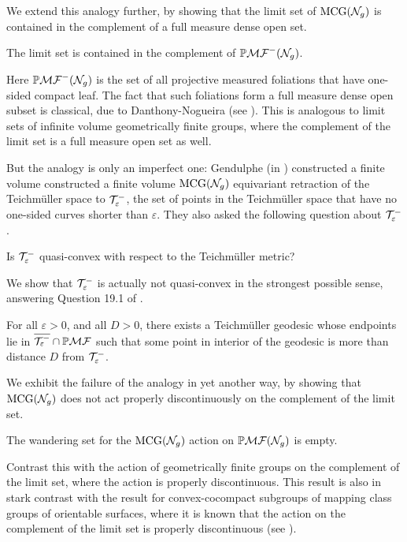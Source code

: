 \documentclass[12pt, reqno]{amsart}
\begin{document}
We extend this analogy further, by showing that the limit set of $\mathrm{MCG}(\mathcal{N}_g)$ is contained in the complement of a full measure dense open set.
\begingroup
\def\thetheorem{\ref{cor:geolimset}}
\begin{theorem}
  The limit set is contained in the complement of $\mathbb{P}\mathcal{MF}^-(\mathcal{N}_g)$.
\end{theorem}
\addtocounter{theorem}{-1}
\endgroup
Here $\mathbb{P}\mathcal{MF}^-(\mathcal{N}_g)$ is the set of all projective measured foliations that have one-sided compact leaf.
The fact that such foliations form a full measure dense open subset is classical, due to Danthony-Nogueira (see \cite{ASENS_1990_4_23_3_469_0}).
This is analogous to limit sets of infinite volume geometrically finite groups, where the complement of the limit set is a full measure open set as well.

But the analogy is only an imperfect one: Gendulphe (in \cite{gendulphe_whats_2017}) constructed a finite volume
constructed a finite volume $\mathrm{MCG}(\mathcal{N}_g)$ equivariant retraction of the Teichm\"uller space to $\mathcal{T}_{\varepsilon}^{-}$, the set of points in the Teichm\"uller space that have no one-sided curves shorter than $\varepsilon$.
They also asked the following question about $\mathcal{T}_{\varepsilon}^{-}$.
\begin{unquestion}
  Is $\mathcal{T}_{\varepsilon}^{-}$ quasi-convex with respect to the Teichmüller metric?
\end{unquestion}
We show that $\mathcal{T}_{\varepsilon}^{-}$ is actually not quasi-convex in the strongest possible sense, answering Question 19.1 of \cite{gendulphe_whats_2017}.
\begingroup
\def\thetheorem{\ref{thm:qc-fail}}
\begin{theorem}
  For all $\varepsilon > 0$, and all $D > 0$, there exists a Teichm\"uller geodesic whose endpoints lie in $\overline{\mathcal{T}_{\varepsilon}^{-}} \cap \mathbb{P}\mathcal{MF}$ such that some point in interior of the geodesic is more than distance $D$ from $\mathcal{T}_{\varepsilon}^{-}$.
\end{theorem}
\addtocounter{theorem}{-1}
\endgroup
We exhibit the failure of the analogy in yet another way, by showing that $\mathrm{MCG}(\mathcal{N}_g)$ does not act properly discontinuously on the complement of the limit set.
\begingroup
\def\thetheorem{\ref{thm:dod-is-empty}}
\begin{theorem}
  The wandering set for the $\mathrm{MCG}(\mathcal{N}_g)$ action on $\mathbb{P}\mathcal{MF}(\mathcal{N}_g)$ is empty.
\end{theorem}
\addtocounter{theorem}{-1}
\endgroup
Contrast this with the action of geometrically finite groups on the complement of the limit set, where the action is properly discontinuous.
This result is also in stark contrast with the result for convex-cocompact subgroups of mapping class groups of orientable surfaces, where it is known that the action on the complement of the limit set is properly discontinuous (see \cite{farb2002convex}).
\end{document}
